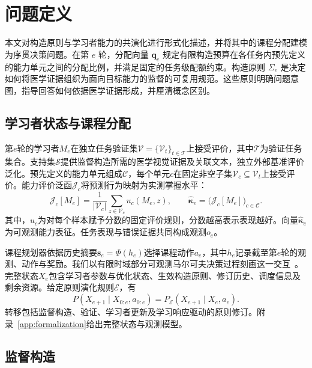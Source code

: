 \section{问题定义}
\label{sec:problem}

本文对构造原则与学习者能力的共演化进行形式化描述，并将其中的课程分配建模为序贯决策问题。在第 $e$ 轮，分配向量 $\boldsymbol q_e$ 规定有限构造预算在各任务内预先定义的能力单元之间的分配比例，并满足固定的任务级配额约束。构造原则 $\Sigma_e$ 是决定如何将医学证据组织为面向目标能力的监督的可复用规范。这些原则明确问题意图，指导回答如何依据医学证据形成，并厘清概念区别。

\subsection{学习者状态与课程分配}

第$e$轮的学习者$M_e$在独立任务验证集$\mathcal V=\{\mathcal V_t\}_{t\in\mathcal T}$上接受评价，其中$\mathcal T$为验证任务集合。支持集$\mathcal S$提供监督构造所需的医学视觉证据及关联文本，独立外部基准评价泛化。预先定义的能力单元组成$\mathcal C$，每个单元$c$在固定非空子集$\mathcal V_c\subseteq\mathcal V_t$上接受评价。能力评价泛函$\mathcal J_c$将预测行为映射为实测掌握水平：
\begin{equation}
\mathcal J_c[M_e]=\frac{1}{|\mathcal V_c|}\sum_{z\in\mathcal V_c}u_c(M_e,z),
\qquad
\widehat{\boldsymbol\kappa}_e=\bigl(\mathcal J_c[M_e]\bigr)_{c\in\mathcal C}.
\label{eq:capability_level}
\end{equation}
其中，$u_c$为对每个样本赋予分数的固定评价规则，分数越高表示表现越好。向量$\widehat{\boldsymbol\kappa}_e$为可观测能力表征。任务表现与错误证据共同构成观测$o_e$。

课程规划器依据历史摘要$\mathbf{s}_e=\Phi(h_e)$选择课程动作$a_e$，其中$h_e$记录截至第$e$轮的观测、动作与奖励。我们以有限时域部分可观测马尔可夫决策过程刻画这一交互~\citep{kaelbling1998planning,matiisen2017teacher}。完整状态$X_e$包含学习者参数与优化状态、生效构造原则、修订历史、调度信息及剩余资源。给定原则演化规则$\mathscr E$，有
\begin{equation}
P(X_{e+1}\mid X_{0:e},a_{0:e})
=P_{\mathscr E}(X_{e+1}\mid X_e,a_e).
\label{eq:transition}
\end{equation}
转移包括监督构造、验证、学习者更新及学习响应驱动的原则修订。附录~\ref{app:formalization}给出完整状态与观测模型。

\subsection{监督构造}
\label{sec:supervision_evolution}

